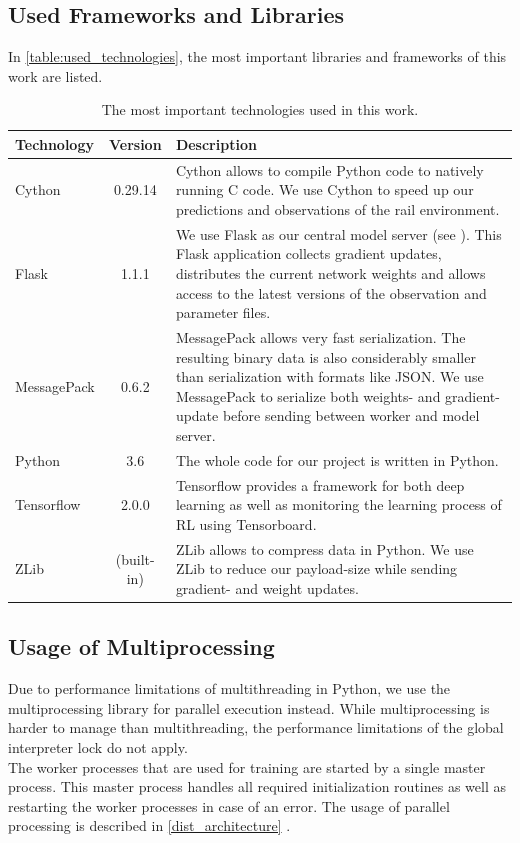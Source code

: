 \subsection*{Used Frameworks and Libraries}\label{framework_and_libraries}
In \autoref{table:used_technologies}, the most important libraries and frameworks of this work are listed.
\begin{table}[H]
	\centering
	\begin{tabularx}{\textwidth}{ |l|c|X| }
		\hline
		\textbf{Technology}	& \textbf{Version} & \textbf{Description}\\
		\hline
		Cython & 0.29.14 & Cython allows to compile Python code to natively running C code. We use Cython to speed up our predictions and observations of the rail environment.\\
		\hline
		Flask & 1.1.1 & We use Flask as our central model server (see \nameref{dist_architecture}). This Flask application collects gradient updates, distributes the current network weights and allows access to the latest versions of the observation and parameter files.\\
		\hline
		MessagePack & 0.6.2 & MessagePack allows very fast serialization. The resulting binary data is also considerably smaller than serialization with formats like JSON. We use MessagePack to serialize both weights- and gradient-update before sending between worker and model server.\\
		\hline
		Python & 3.6 & The whole code for our project is written in Python.\\
		\hline
		Tensorflow & 2.0.0 & Tensorflow provides a framework for both deep learning as well as monitoring the learning process of RL using Tensorboard.\\
		\hline
		ZLib & (built-in) & ZLib allows to compress data in Python. We use ZLib to reduce our payload-size while sending gradient- and weight updates.\\
		\hline
	\end{tabularx}
	\caption{The most important technologies used in this work.}
	\label{table:used_technologies}
\end{table}
\subsection*{Usage of Multiprocessing}\label{multiprocessing}
Due to performance limitations of multithreading in Python, we use the multiprocessing library for parallel execution instead. While multiprocessing is harder to manage than multithreading, the performance limitations of the global interpreter lock \cite{python_gil} do not apply.\\
The worker processes that are used for training are started by a single master process. This master process handles all required initialization routines as well as restarting the worker processes in case of an error. The usage of parallel processing is described in \ref{dist_architecture} .

